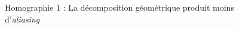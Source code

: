\begin{figure}
\caption{Homographie 1 : La décomposition géométrique produit moins d'\emph{aliasing}}
\label{Homo1}
\end{figure}

